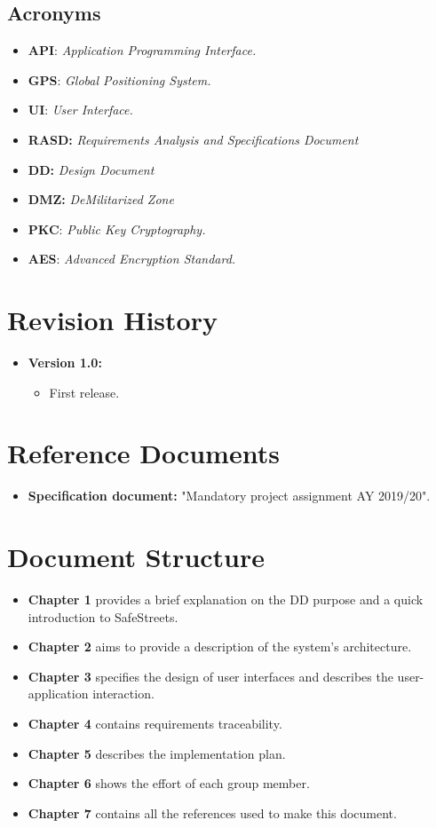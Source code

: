 \documentclass[12pt,a4paper]{report}
\begin{document}
			\subsection{Acronyms}
				\begin{itemize}
				\item \textbf{API}: \emph{Application Programming Interface.}
				\item \textbf{GPS}: \emph{Global Positioning System.}
				\item \textbf{UI}: \emph{User Interface.}
				\item \textbf{RASD:} \emph{Requirements Analysis and Specifications Document}
				\item \textbf{DD:} \emph{Design Document}
				\item \textbf{DMZ:} \emph{DeMilitarized Zone}			
				\item \textbf{PKC}: \emph{Public Key Cryptography.}		
				\item \textbf{AES}: \emph{Advanced Encryption Standard.}		
				\end{itemize}
		\section{Revision History}
			\begin{itemize}
				\item \textbf{Version 1.0:} 
				\begin{itemize}
					\item First release.
				\end{itemize}
			\end {itemize}
		\section{Reference Documents}
			\begin{itemize}
				\item \textbf{Specification document:} "Mandatory project assignment AY 2019/20".
			\end{itemize}
		\section{Document Structure}
			\begin{itemize}
				\item \textbf{Chapter 1} provides a brief explanation on the DD purpose and a quick introduction to SafeStreets.
				\item \textbf{Chapter 2} aims to provide a description of the system's architecture. 
				\item \textbf{Chapter 3} specifies the design of user interfaces and describes the user-application
					interaction.
				\item \textbf{Chapter 4} contains requirements traceability.
				\item \textbf{Chapter 5} describes the implementation plan.
				\item \textbf{Chapter 6} shows the effort of each group member.
				\item \textbf{Chapter 7} contains all the references used to make this document. 
			\end{itemize}
	
\end{document}
